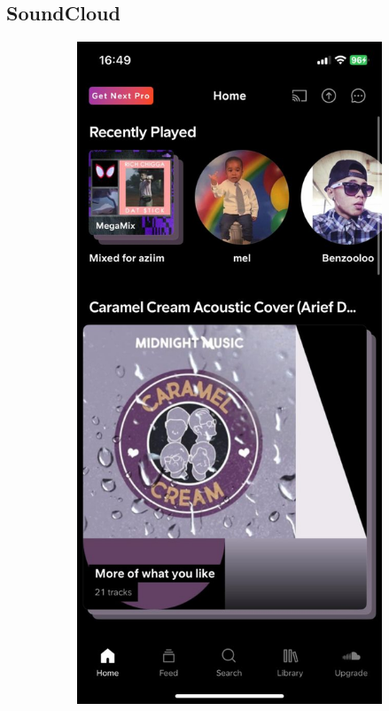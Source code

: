 \subsection{SoundCloud}
\begin{figure} [h]
    \centering
    \begin{subfigure}{.3\linewidth}
      \centering
      \includegraphics[width = \linewidth]{mainmatter/images/soundcloud1.jpg}

\end{subfigure}
\end{figure}
